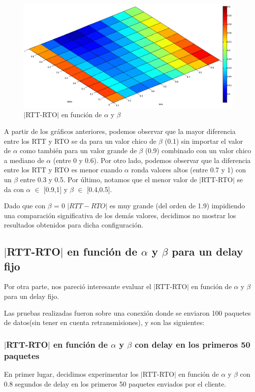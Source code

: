 \documentclass[10pt, a4paper]{article}
\begin{document}
\begin{figure}[H]
\begin{center}
\includegraphics[width=17cm]{alpha-beta-dif-sinCeroB.png}
\caption{$|$RTT-RTO$|$ en función de $\alpha$ y $\beta$}
\end{center}
\end{figure}

A partir de los gráficos anteriores, podemos observar que la mayor diferencia entre los RTT y RTO se da para un valor chico de $\beta$ (0.1) sin importar el valor de $\alpha$ como también para un valor grande de $\beta$ (0.9) combinado con un valor chico a mediano de $\alpha$ (entre 0 y 0.6).
Por otro lado, podemos observar que la diferencia entre los RTT y RTO es menor cuando $\alpha$ ronda valores altos (entre 0.7 y 1) con un $\beta$ entre 0.3 y 0.5.
Por último, notamos que el menor valor de $|$RTT-RTO$|$ se da con $\alpha$ $\in$ [0.9,1] y $\beta$ $\in$ [0.4,0.5].

Dado que con $\beta$ = 0 $|RTT-RTO|$ es muy grande (del orden de 1.9) impidiendo una comparación significativa de los demás valores, decidimos no mostrar los resultados obtenidos para dicha configuración.

\newpage
\subsection{$|$RTT-RTO$|$ en función de $\alpha$ y $\beta$ para un delay fijo}

Por otra parte, nos pareció interesante evaluar el $|$RTT-RTO$|$ en función de $\alpha$ y $\beta$ para un delay fijo. 

Las pruebas realizadas fueron sobre una conexión donde se enviaron 100 paquetes de datos(sin tener en cuenta retransmisiones), y son  las siguientes:

\subsubsection{$|$RTT-RTO$|$ en función de $\alpha$ y $\beta$ con delay en los primeros 50 paquetes}
En primer lugar, decidimos experimentar los $|$RTT-RTO$|$ en función de $\alpha$ y $\beta$ con 0.8 segundos de delay en los primeros 50 paquetes enviados por el cliente.
\end{document}
